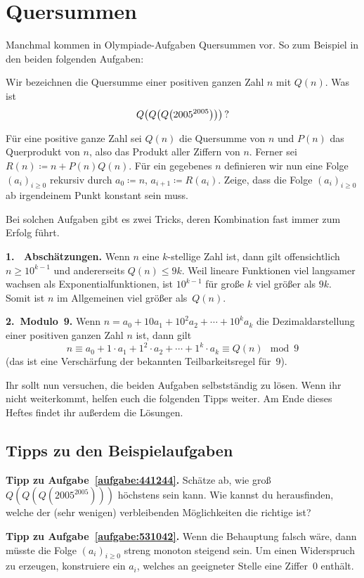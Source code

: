 \section{Quersummen}\label{kapitel:Quersummen}
Manchmal kommen in Olympiade-Aufgaben Quersummen vor. So zum Beispiel in den beiden folgenden Aufgaben:
\begin{aufgabe*}\label{aufgabe:441244}
	Wir bezeichnen die Quersumme einer positiven ganzen Zahl $n$ mit $Q(n)$. Was ist
	\begin{equation*}
		Q\parens*{Q\parens*{Q\parens*{2005^{2005}}}}\,?
	\end{equation*}
\end{aufgabe*}
\begin{aufgabe*}\label{aufgabe:531042}
	Für eine positive ganze Zahl sei $Q(n)$ die Quersumme von $n$ und $P(n)$ das Querprodukt von $n$, also das Produkt aller Ziffern von $n$. Ferner sei $R(n)\coloneqq n+P(n)Q(n)$. Für ein gegebenes $n$ definieren wir nun eine Folge $(a_i)_{i\geqslant 0}$ rekursiv durch $a_0\coloneqq n$, $a_{i+1}\coloneqq R(a_i)$. Zeige, dass die Folge $(a_i)_{i\geqslant 0}$ ab irgendeinem Punkt konstant sein muss.
\end{aufgabe*}

Bei solchen Aufgaben gibt es zwei Tricks, deren Kombination fast immer zum Erfolg führt.

\textbf{1. ~Abschätzungen.} Wenn $n$ eine $k$-stellige Zahl ist, dann gilt offensichtlich $n\geqslant 10^{k-1}$ und andererseits $Q(n)\leqslant 9k$. Weil lineare Funktionen viel langsamer wachsen als Exponentialfunktionen, ist $10^{k-1}$ für große $k$ viel größer als $9k$. Somit ist $n$ im Allgemeinen viel größer als~$Q(n)$.

\textbf{2.~Modulo~9.} Wenn $n=a_0+10a_1+10^2a_2+\dotsb+10^ka_k$ die Dezimaldarstellung einer positiven ganzen Zahl $n$ ist, dann gilt
\begin{equation*}
	n\equiv a_0+1\cdot a_1+1^2\cdot a_2+\dotsb+1^k\cdot a_k\equiv Q(n)\mod 9
\end{equation*}
(das ist eine Verschärfung der bekannten Teilbarkeitsregel für~$9$).

Ihr sollt nun versuchen, die beiden Aufgaben selbstständig zu lösen. Wenn ihr nicht weiterkommt, helfen euch die folgenden Tipps weiter. Am Ende dieses Heftes findet ihr außerdem die Lösungen.

\subsection*{Tipps zu den Beispielaufgaben}

\textbf{Tipp zu Aufgabe~\ref{aufgabe:441244}.} Schätze ab, wie groß $Q(Q(Q(2005^{2005})))$ höchstens sein kann. Wie kannst du herausfinden, welche der (sehr wenigen) verbleibenden Möglichkeiten die richtige ist?

\textbf{Tipp zu Aufgabe~\ref{aufgabe:531042}.} Wenn die Behauptung falsch wäre, dann müsste die Folge $(a_i)_{i\geqslant 0}$ streng monoton steigend sein. Um einen Widerspruch zu erzeugen, konstruiere ein $a_i$, welches an geeigneter Stelle eine Ziffer~$0$ enthält.